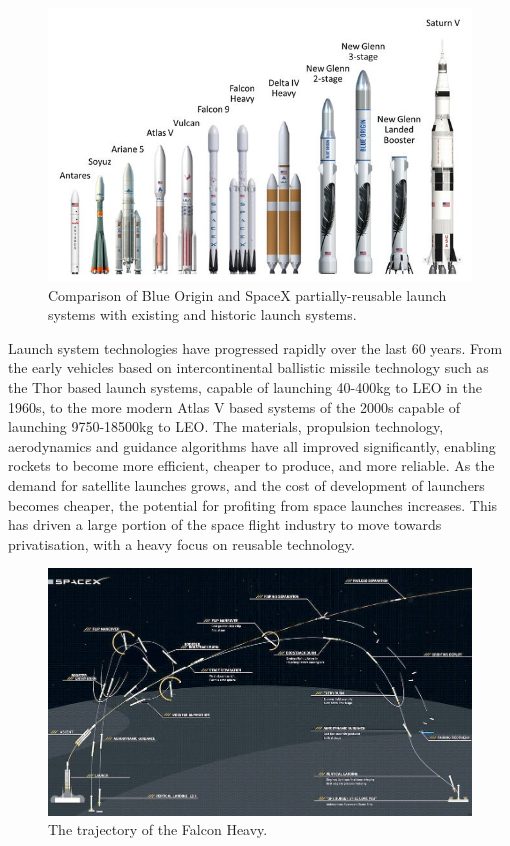    \begin{figure}[ht]
   	\centering
   	\includegraphics[width=0.9\linewidth]{figures/2_literature-review/LaunchVehicles}
   	\caption{Comparison of Blue Origin and SpaceX partially-reusable launch systems with existing and historic launch systems\cite{BlueOrigin}.}
   	\label{fig:LaunchVehicles}
   \end{figure}
  
  Launch system technologies have progressed rapidly over the last 60 years. From the early vehicles based on intercontinental ballistic missile technology such as the Thor based launch systems, capable of launching 40-400kg to LEO in the 1960s, to the more modern Atlas V based systems of the 2000s capable of launching 9750-18500kg to LEO\cite{Kendall2010}. 
  The materials, propulsion technology, aerodynamics and guidance algorithms have all improved significantly, enabling  rockets to become more efficient, cheaper to produce, and more reliable. As the demand for satellite launches grows, and the cost of development of launchers becomes cheaper, the potential for profiting from space launches increases. 
  This has driven a large portion of the space flight industry to move towards privatisation, with a heavy focus on reusable technology. 
    \begin{figure}[ht]
    	\centering
    	\includegraphics[width=1\linewidth]{"figures/2_literature-review/FalconTrajectory"}
    	\caption{The trajectory of the Falcon Heavy\cite{FalconHeavy}.}
    	\label{fig:FalconTrajectory}
    \end{figure}
    
